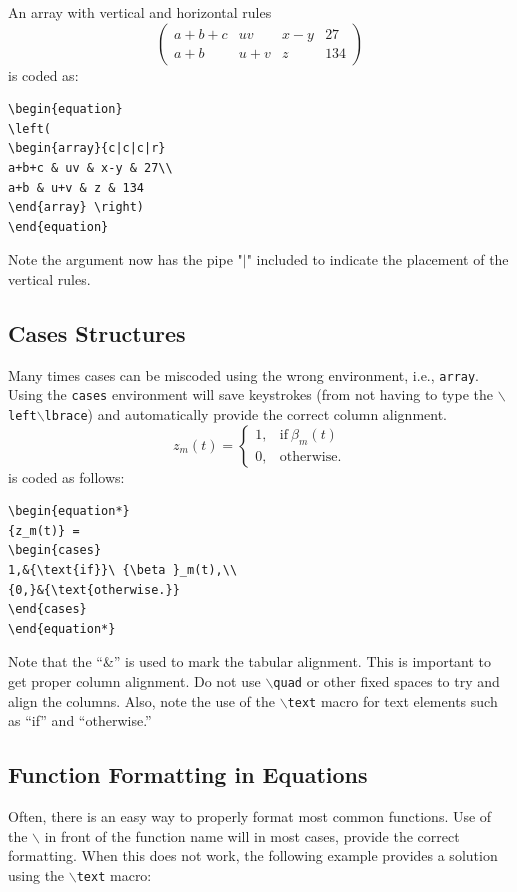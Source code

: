 \documentclass[journal]{IEEEtran}
\begin{document}
An array with vertical and horizontal rules
\begin{equation}
\left( \begin{array}{c|c|c|r}
a+b+c & uv & x-y & 27\\ \hline
a+b & u+v & z & 134
\end{array}\right)
\end{equation}
is coded as:
\begin{verbatim}
\begin{equation}
\left(
\begin{array}{c|c|c|r}
a+b+c & uv & x-y & 27\\
a+b & u+v & z & 134
\end{array} \right)
\end{equation}
\end{verbatim}
Note the argument now has the pipe "$\vert$" included to indicate the placement of the vertical rules.


\subsection{Cases Structures}
Many times cases can be miscoded using the wrong environment, i.e., {\tt{array}}. Using the {\tt{cases}} environment will save keystrokes (from not having to type the $\backslash${\tt{left}}$\backslash${\tt{lbrace}}) and automatically provide the correct column alignment.
\begin{equation*}
{z_m(t)} = \begin{cases}
1,&{\text{if}}\ {\beta }_m(t) \\ 
{0,}&{\text{otherwise.}} 
\end{cases}
\end{equation*}
\noindent is coded as follows:
\begin{verbatim}
\begin{equation*}
{z_m(t)} = 
\begin{cases}
1,&{\text{if}}\ {\beta }_m(t),\\ 
{0,}&{\text{otherwise.}} 
\end{cases}
\end{equation*}
\end{verbatim}
\noindent Note that the ``\&'' is used to mark the tabular alignment. This is important to get  proper column alignment. Do not use $\backslash${\tt{quad}} or other fixed spaces to try and align the columns. Also, note the use of the $\backslash${\tt{text}} macro for text elements such as ``if'' and ``otherwise.''

\subsection{Function Formatting in Equations}
Often, there is an easy way to properly format most common functions. Use of the $\backslash$ in front of the function name will in most cases, provide the correct formatting. When this does not work, the following example provides a solution using the $\backslash${\tt{text}} macro:
\end{document}
